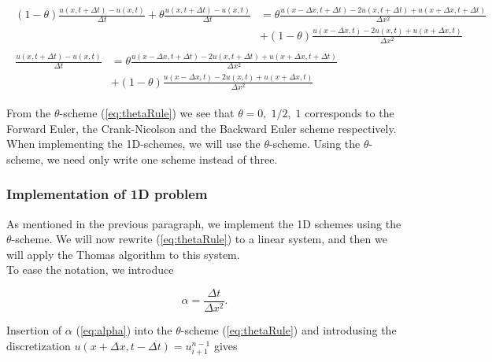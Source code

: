 \documentclass{article}
\begin{document}
\begin{subequations}
	\begin{align}
		\begin{split}
			(1-\theta) 	\frac{u(x,t+\Delta t) - u(x,t)}{\Delta t} + \theta 	\frac{u(x,t+\Delta t) - u(x,t)}{\Delta t}&=  \theta \frac{u(x-\Delta x,t+ \Delta t)
				- 2u(x,t+\Delta t) +u(x+\Delta x,t+\Delta t)}{\Delta x^2} \\
			&+ (1 - \theta) \frac{u(x-\Delta x,t) - 2u(x,t) +u(x+ \Delta x,t)}{\Delta x^2} 
		\end{split}\\
		\begin{split}
			\frac{u(x,t+\Delta t) - u(x,t)}{\Delta t}&= 
			  \theta \frac{u(x-\Delta x,t+ \Delta t)
				- 2u(x,t+\Delta t) +u(x+\Delta x,t+\Delta t)}{\Delta x^2} \\
			&+ (1 - \theta) \frac{u(x-\Delta x,t) - 2u(x,t) +u(x+ \Delta x,t)}{\Delta x^2} 
			\end{split}\label{eq:thetaRule}
	\end{align}
\end{subequations}

From the $\theta$-scheme (\ref{eq:thetaRule}) we see that $\theta = 0,\;1/2,\;1$ corresponds to the Forward Euler, the Crank-Nicolson and the Backward Euler scheme respectively.\\

When implementing the 1D-schemes, we will use the $\theta$-scheme. Using the $\theta$-scheme, we need only write one scheme instead of three.

\subsubsection{Implementation of 1D problem}
As mentioned in the previous paragraph, we implement the 1D schemes using the $\theta$-scheme. We will now rewrite (\ref{eq:thetaRule}) to a linear system, and then we will apply the Thomas algorithm to this system.\\

To ease the notation, we introduce 

\begin{equation}\label{eq:alpha}
	\alpha = \frac{\Delta t}{\Delta x^2}.
\end{equation}

Insertion of $\alpha$ (\ref{eq:alpha}) into the $\theta$-scheme (\ref{eq:thetaRule}) and introdusing the discretization $u(x + \Delta x, t - \Delta t) = u_{i+1}^{n-1}$ gives
\end{document}
